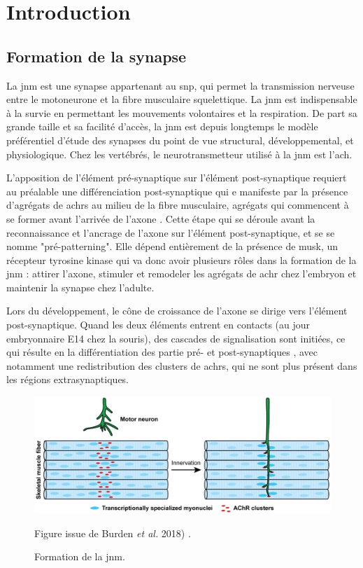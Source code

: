 \chapter{Introduction}

\section{Formation de la synapse}
	\label{sec:IntroSynapse}
	La \gls{jnm} est une synapse appartenant au \gls{snp}, qui permet la transmission nerveuse entre le motoneurone et la fibre musculaire squelettique. La \gls{jnm} est indispensable à la survie en permettant les mouvements volontaires et la respiration. De part sa grande taille et sa facilité d'accès, la \gls{jnm} est depuis longtemps le modèle préférentiel d'étude des synapses du point de vue structural, développemental, et physiologique. Chez les vertébrés, le neurotransmetteur utilisé à la \gls{jnm} est l'\gls{ach}. 
	
	L'apposition de l'élément pré-synaptique sur l'élément post-synaptique requiert au préalable une différenciation post-synaptique qui e manifeste par la présence d'agrégats de \glspl{achr} au milieu de la fibre musculaire, agrégats qui commencent à se former avant l'arrivée de l'axone \cite{Wu2010a, Gordon2012}. Cette étape qui se déroule avant la reconnaissance et l'ancrage de l'axone sur l'élément post-synaptique, et se se nomme "pré-patterning". Elle dépend entièrement de la présence de \acrshort{musk}, un récepteur tyrosine kinase qui va donc avoir plusieurs rôles dans la formation de la \gls{jnm} : attirer l'axone, stimuler et remodeler les agrégats de \gls{achr} chez l'embryon et maintenir la synapse chez l'adulte.
	
	Lors du développement, le cône de croissance de l'axone se dirige vers l'élément post-synaptique. Quand les deux éléments entrent en contacts (au jour embryonnaire E14 chez la souris), des cascades de signalisation sont initiées, ce qui résulte en la différentiation des partie pré- et post-synaptiques \cite{Sanes1999}, avec notamment une redistribution des clusters de \glspl{achr}, qui ne sont plus présent dans les régions extrasynaptiques.
	
	\begin{figure}
		\includegraphics[width=\textwidth]{./Images/formation_jnm.png}
		\caption{Formation de la \gls{jnm}.} {Figure issue de Burden \emph{et al.} 2018) \cite{Burden2018}.}
		\label{fig:FormaJNM}
	\end{figure}
	\clearpage
	
